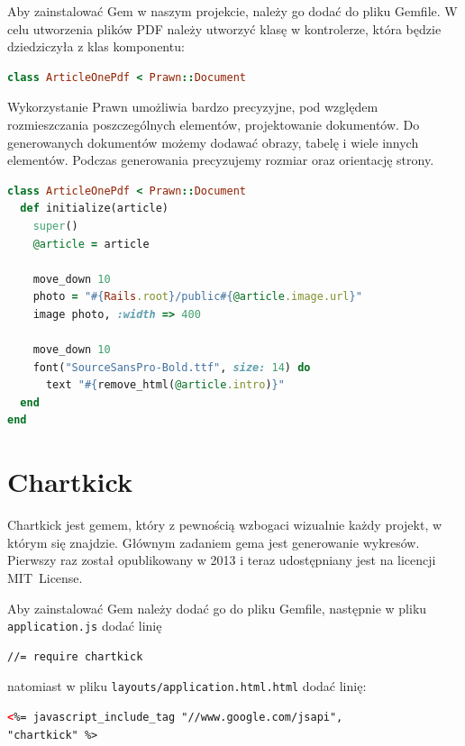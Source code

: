 \documentclass[openright]{xmgr}
\begin{document}
Aby zainstalować Gem w naszym projekcie, należy go dodać do pliku Gemfile. W celu utworzenia plików PDF należy utworzyć klasę w kontrolerze, która będzie dziedziczyła z klas komponentu:
\begin{lstlisting}[language=ruby, caption={Deklaracja klasy generującej plik PDF}]
class ArticleOnePdf < Prawn::Document
\end{lstlisting}
Wykorzystanie Prawn umożliwia bardzo precyzyjne, pod względem rozmieszczania poszczególnych elementów, projektowanie dokumentów. Do generowanych dokumentów możemy dodawać obrazy, tabelę  i wiele innych elementów. Podczas generowania precyzujemy rozmiar oraz orientację strony. 
\begin{lstlisting}[language=ruby, caption={Kod generujacy dokment zawierający ilustrację i wstęp do artykułu}]
class ArticleOnePdf < Prawn::Document
  def initialize(article)
    super()
    @article = article    

    move_down 10
    photo = "#{Rails.root}/public#{@article.image.url}"
    image photo, :width => 400

    move_down 10
    font("SourceSansPro-Bold.ttf", size: 14) do
      text "#{remove_html(@article.intro)}"
  end
end
\end{lstlisting}

\newpage

\section{Chartkick}
Chartkick \cite{chartkick} jest gemem, który z pewnością wzbogaci wizualnie każdy projekt, w którym się znajdzie. Głównym zadaniem gema jest generowanie wykresów. Pierwszy raz został opublikowany w 2013 i teraz udostępniany jest na licencji \mbox{MIT License. }

Aby zainstalować Gem należy dodać go do pliku Gemfile, następnie w pliku \texttt{application.js} dodać linię 
\begin{lstlisting}[language=html, caption={Framgent zawartości pliku application.js}]
//= require chartkick
\end{lstlisting}
natomiast w pliku \texttt{layouts/application.html.html} dodać linię:
\begin{lstlisting}[language=html, caption={Framgent zawartości pliku application.html.rb}]
<%= javascript_include_tag "//www.google.com/jsapi", 
"chartkick" %>
\end{lstlisting}

\newpage
\end{document}
